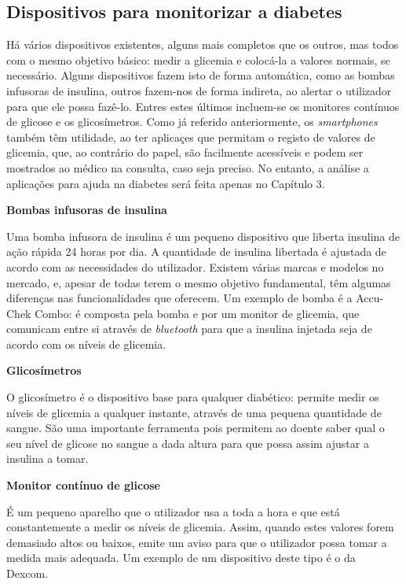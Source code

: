\subsection{Dispositivos para monitorizar a diabetes}

Há vários dispositivos existentes, alguns mais completos que os outros, mas todos com o mesmo objetivo básico: medir a glicemia e colocá-la a valores normais, se necessário. Alguns dispositivos fazem isto de forma automática, como as bombas infusoras de insulina, outros fazem-nos de forma indireta, ao alertar o utilizador para que ele possa fazê-lo. Entres estes últimos incluem-se os monitores contínuos de glicose e os glicosímetros. 
Como já referido anteriormente, os \textit{smartphones} também têm utilidade, ao ter aplicaçes que permitam o registo de valores de glicemia, que, ao contrário do papel, são facilmente acessíveis e podem ser mostrados ao médico na consulta, caso seja preciso. No entanto, a análise a aplicações para ajuda na diabetes será feita apenas no Capítulo 3.

\textbf{Bombas infusoras de insulina}

Uma bomba infusora de insulina é um pequeno dispositivo que liberta insulina de ação rápida 24 horas por dia. A quantidade de insulina libertada é ajustada de acordo com as necessidades do utilizador. Existem várias marcas e modelos no mercado, e, apesar de todas terem o mesmo objetivo fundamental, têm algumas diferenças nas funcionalidades que oferecem. Um exemplo de bomba é a Accu-Chek Combo: é composta pela bomba e por um monitor de glicemia, que comunicam entre si através de \textit{bluetooth} para que a insulina injetada seja de acordo com os níveis de glicemia.~\cite{akku}

\textbf{Glicosímetros}

O glicosímetro é o dispositivo base para qualquer diabético: permite medir os níveis de glicemia a qualquer instante, através de uma pequena quantidade de sangue. São uma importante ferramenta pois permitem ao doente saber qual o seu nível de glicose no sangue a dada altura para que possa assim ajustar a insulina a tomar.

\textbf{Monitor contínuo de glicose}

É um pequeno aparelho que o utilizador usa a toda a hora e que está constantemente a medir os níveis de glicemia. Assim, quando estes valores forem demasiado altos ou baixos, emite um aviso para que o utilizador possa tomar a medida mais adequada. Um exemplo de um dispositivo deste tipo é o da Dexcom.~\cite{cgm}


